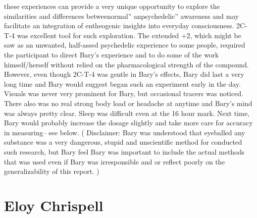 \documentclass[12pt]{book}
\begin{document}
these experiences can provide a very unique opportunity to explore the similarities and differences betweenormal'' anpsychedelic'' awareness and may facilitate an integration of entheogenic insights into everyday consciousness. 2C-T-4 was excellent tool for such exploration. The extended +2, which might be saw as an unwanted, half-assed psychedelic experience to some people, required the participant to direct Bary's experience and to do some of the work himself/herself without relied on the pharmacological strength of the compound. However, even though 2C-T-4 was gentle in Bary's effects, Bary did last a very long time and Bary would suggest began such an experiment early in the day. Visuals was never very prominent for Bary, but occasional tracers was noticed. There also was no real strong body load or headache at anytime and Bary's mind was always pretty clear. Sleep was difficult even at the 16 hour mark. Next time, Bary would probably increase the dosage slightly and take more care for accuracy in measuring-- see below. ( Disclaimer: Bary was understood that eyeballed any substance was a very dangerous, stupid and unscientific method for conducted such research, but Bary feel Bary was important to include the actual methods that was used even if Bary was irresponsible and or reflect poorly on the generalizability of this report. )



\chapter{Eloy Chrispell}
\end{document}
